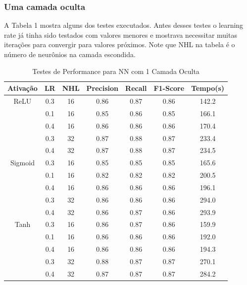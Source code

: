 \documentclass[conference]{IEEEtran}
\begin{document}
\subsubsection{Uma camada oculta}
	
	A Tabela 1 mostra alguns dos testes executados. Antes desses testes o learning rate já tinha sido testados com valores menores e mostrava necessitar muitas iterações para convergir para valores próximos. Note que NHL na tabela é o número de neurônios na camada escondida.
	
\begin{table}[h!]
 \begin{center}
  \caption{Testes de Performance para NN com 1 Camada Oculta}
  \label{table:table1}
  \begin{tabular}{ |c|c|c|c|c|c|c| }
   \hline
   Ativação & LR & NHL & Precision & Recall & F1-Score & Tempo(s)\\
   \hline
   ReLU & 0.3 & 16 & 0.86 & 0.87 & 0.86 & 142.2 \\ 
                   & 0.1 & 16 & 0.85 & 0.86 & 0.85 & 166.1 \\
                   & 0.4 & 16 & 0.86 & 0.86 & 0.86 & 170.4 \\
                   & 0.3 & 32 & 0.87 & 0.88 & 0.87 & 233.4 \\
                   & 0.4 & 32 & 0.87 & 0.88 & 0.87 & 234.5 \\
   \hline
   Sigmoid & 0.3 & 16 & 0.85 & 0.85 & 0.85 & 165.6 \\ 
                     & 0.1 & 16 & 0.82 & 0.82 & 0.82 & 200.5 \\
                     & 0.4 & 16 & 0.86 & 0.86 & 0.86 & 196.1 \\
                     & 0.3 & 32 & 0.86 & 0.86 & 0.86 & 294.0 \\
                     & 0.4 & 32 & 0.86 & 0.87 & 0.86 & 293.9 \\	
   \hline
   Tanh & 0.3 & 16 & 0.86 & 0.87 & 0.86 & 159.9 \\ 
                     & 0.1 & 16 & 0.86 & 0.86 & 0.86 & 192.0 \\
                     & 0.4 & 16 & 0.86 & 0.86 & 0.86 & 194.3 \\
                     & 0.3 & 32 & 0.88 & 0.87 & 0.87 & 270.1 \\
                     & 0.4 & 32 & 0.87 & 0.87 & 0.87 & 284.2 \\

 \hline
 \end{tabular}
 \end{center}
\end{table}
\end{document}
